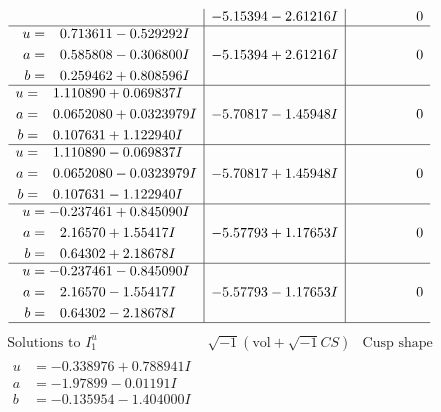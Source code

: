 \documentclass[1p]{elsarticle_modified}
\theoremstyle{definition}
\newcommand{\I}{\sqrt{-1}}
\begin{document}
$$\begin{array}{c|c|c}
 & -5.15394 - 2.61216 I & \phantom{-0.000000 } 0 \\ \hline\begin{aligned}
u &= \phantom{-}0.713611 - 0.529292 I \\
a &= \phantom{-}0.585808 - 0.306800 I \\
b &= \phantom{-}0.259462 + 0.808596 I\end{aligned}
 & -5.15394 + 2.61216 I & \phantom{-0.000000 } 0 \\ \hline\begin{aligned}
u &= \phantom{-}1.110890 + 0.069837 I \\
a &= \phantom{-}0.0652080 + 0.0323979 I \\
b &= \phantom{-}0.107631 + 1.122940 I\end{aligned}
 & -5.70817 - 1.45948 I & \phantom{-0.000000 } 0 \\ \hline\begin{aligned}
u &= \phantom{-}1.110890 - 0.069837 I \\
a &= \phantom{-}0.0652080 - 0.0323979 I \\
b &= \phantom{-}0.107631 - 1.122940 I\end{aligned}
 & -5.70817 + 1.45948 I & \phantom{-0.000000 } 0 \\ \hline\begin{aligned}
u &= -0.237461 + 0.845090 I \\
a &= \phantom{-}2.16570 + 1.55417 I \\
b &= \phantom{-}0.64302 + 2.18678 I\end{aligned}
 & -5.57793 + 1.17653 I & \phantom{-0.000000 } 0 \\ \hline\begin{aligned}
u &= -0.237461 - 0.845090 I \\
a &= \phantom{-}2.16570 - 1.55417 I \\
b &= \phantom{-}0.64302 - 2.18678 I\end{aligned}
 & -5.57793 - 1.17653 I & \phantom{-0.000000 } 0\\
 \hline 
 \end{array}$$\newpage$$\begin{array}{c|c|c}  
\text{Solutions to }I^u_{1}& \I (\text{vol} + \sqrt{-1}CS) & \text{Cusp shape}\\
 \hline 
\begin{aligned}
u &= -0.338976 + 0.788941 I \\
a &= -1.97899 - 0.01191 I \\
b &= -0.135954 - 1.404000 I\end{aligned}

\end{array}$$
\end{document}
